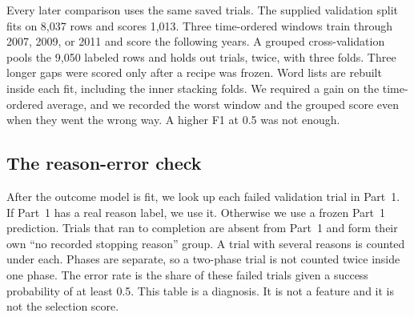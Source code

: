 Every later comparison uses the same saved trials. The supplied validation
split fits on 8,037 rows and scores 1,013. Three time-ordered windows train
through 2007, 2009, or 2011 and score the following years. A grouped
cross-validation pools the 9,050 labeled rows and holds out trials, twice,
with three folds. Three longer gaps were scored only after a recipe was
frozen. Word lists are rebuilt inside each fit, including the inner stacking
folds. We required a gain on the time-ordered average, and we recorded the
worst window and the grouped score even when they went the wrong way. A
higher F1 at 0.5 was not enough.

\subsection{The reason-error check}

After the outcome model is fit, we look up each failed validation trial in
Part~1. If Part~1 has a real reason label, we use it. Otherwise we use a
frozen Part~1 prediction. Trials that ran to completion are absent from
Part~1 and form their own ``no recorded stopping reason'' group. A trial with
several reasons is counted under each. Phases are separate, so a two-phase
trial is not counted twice inside one phase. The error rate is the share of
these failed trials given a success probability of at least 0.5. This table
is a diagnosis. It is not a feature and it is not the selection score.
